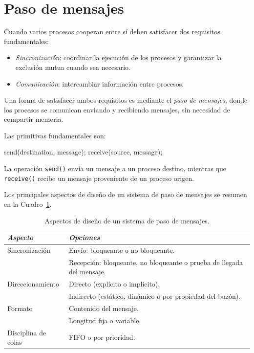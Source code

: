 \section{Paso de mensajes}

Cuando varios procesos cooperan entre sí deben satisfacer dos requisitos fundamentales:
\begin{itemize}
  \item \textit{Sincronización}: coordinar la ejecución de los procesos y garantizar la exclusión mutua cuando sea necesario.
  \item \textit{Comunicación}: intercambiar información entre procesos.
\end{itemize}

Una forma de satisfacer ambos requisitos es mediante el \textit{paso de mensajes}, donde los procesos se comunican enviando y recibiendo mensajes, sin necesidad de compartir memoria.

Las primitivas fundamentales son:
\begin{ccode}
send(destination, message);
receive(source, message);
\end{ccode}

La operación \texttt{send()} envía un mensaje a un proceso destino, mientras que \texttt{receive()} recibe un mensaje proveniente de un proceso origen.

Los principales aspectos de diseño de un sistema de paso de mensajes se resumen en la Cuadro~\ref{tab:message-passing}.

\begin{table}[!ht]
\centering
\begin{tabular}{p{3.5cm}p{8.5cm}}
\toprule
\textit{Aspecto} & \textit{Opciones} \\
\midrule
Sincronización &
Envío: bloqueante o no bloqueante.\\
&
Recepción: bloqueante, no bloqueante o prueba de llegada del mensaje.\\
\addlinespace

Direccionamiento &
Directo (explícito o implícito).\\
&
Indirecto (estático, dinámico o por propiedad del buzón).\\
\addlinespace

Formato &
Contenido del mensaje.\\
&
Longitud fija o variable.\\
\addlinespace

Disciplina de colas &
FIFO o por prioridad.\\
\bottomrule
\end{tabular}
\caption{Aspectos de diseño de un sistema de paso de mensajes.}
\label{tab:message-passing}
\end{table}


